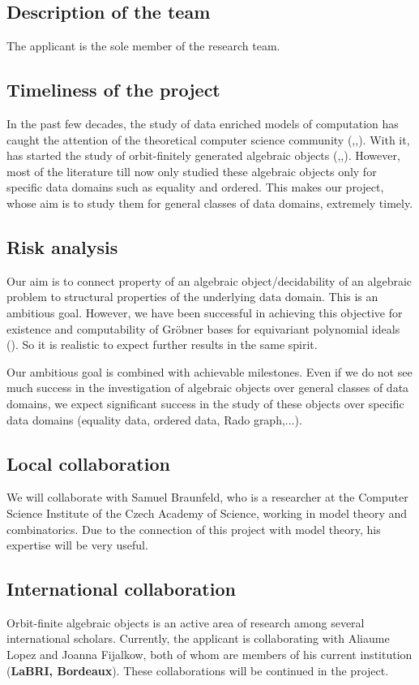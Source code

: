 \documentclass[a4paper,11pt]{article}
\begin{document}
\subsection{Description of the team}
%
The applicant is the sole member of the research team.
%
\subsection{Timeliness of the project}
%
In the past few decades, the study of data enriched models of computation has caught the attention of the theoretical computer science community
(\cite{KF94},\cite{LNORW08},\cite{atombook}).
With it, has started the study of orbit-finitely generated algebraic objects
(\cite{BKM21},,\cite{nomMon}).
However, most of the literature till now only studied these algebraic objects only for specific data domains such as equality and ordered.
This makes our project,
whose aim is to study them for general classes of data domains,
extremely timely.
%
\subsection{Risk analysis}
%
Our aim is to connect property of an algebraic object/decidability of an algebraic problem to structural properties of the underlying data domain.
This is an ambitious goal.
However, we have been successful in achieving this objective for existence and computability of Gr\"{o}bner bases for equivariant polynomial ideals ().
So it is realistic to expect further results in the same spirit.

Our ambitious goal is combined with achievable milestones.
Even if we do not see much success in the investigation of algebraic objects over general classes of data domains,
we expect significant success in the study of these objects over specific data domains (equality data, ordered data, Rado graph,...). 
%
\subsection{Local collaboration}
%
We will collaborate with Samuel Braunfeld,
who is a researcher at the Computer Science Institute of the Czech Academy of Science, working in model theory and combinatorics.
Due to the connection of this project with model theory,
his expertise will be very useful.
%
\subsection{International collaboration}
%
Orbit-finite algebraic objects is an active area of research among several international scholars.
Currently, the applicant is collaborating with Aliaume Lopez and Joanna Fijalkow,
both of whom are members of his current institution (\textbf{LaBRI, Bordeaux}).
These collaborations will be continued in the project. 
\end{document}
